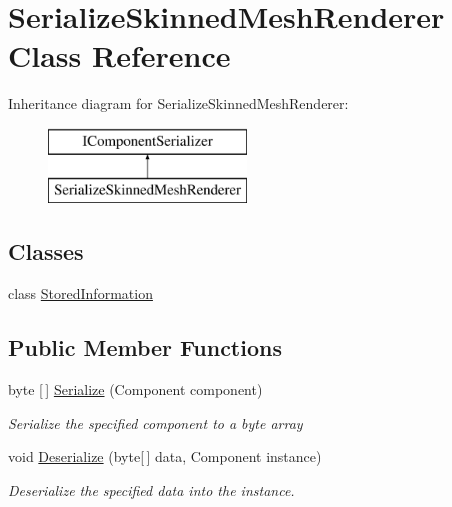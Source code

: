 \hypertarget{class_serialize_skinned_mesh_renderer}{}\section{Serialize\+Skinned\+Mesh\+Renderer Class Reference}
\label{class_serialize_skinned_mesh_renderer}
Inheritance diagram for Serialize\+Skinned\+Mesh\+Renderer\+:\begin{figure}[H]
\begin{center}
\leavevmode
\includegraphics[height=2.000000cm]{class_serialize_skinned_mesh_renderer}
\end{center}
\end{figure}
\subsection*{Classes}
\begin{DoxyCompactItemize}
\item 
class \hyperlink{class_serialize_skinned_mesh_renderer_1_1_stored_information}{Stored\+Information}
\end{DoxyCompactItemize}
\subsection*{Public Member Functions}
\begin{DoxyCompactItemize}
\item 
byte \mbox{[}$\,$\mbox{]} \hyperlink{class_serialize_skinned_mesh_renderer_a5537c5f2cab4580a75bd8f6ef3ef331d}{Serialize} (Component component)
\begin{DoxyCompactList}\small\item\em Serialize the specified component to a byte array \end{DoxyCompactList}\item 
void \hyperlink{class_serialize_skinned_mesh_renderer_ae689a9e0a41aa23ec86f46bffa56b7b5}{Deserialize} (byte\mbox{[}$\,$\mbox{]} data, Component instance)
\begin{DoxyCompactList}\small\item\em Deserialize the specified data into the instance. \end{DoxyCompactList}\end{DoxyCompactItemize}
